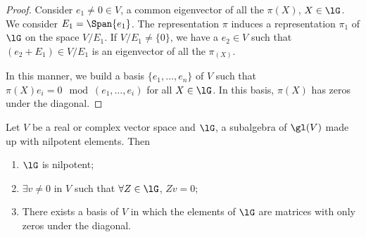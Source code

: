 \begin{proof}
	Consider $e_1\neq 0\in V$, a common eigenvector of all the $\pi(X)$, $X\in\lG$. We consider $E_1=\Span\{e_1\}$. The representation $\pi$ induces a representation $\pi_1$ of $\lG$ on the space $V/E_1$. If $V/E_1\neq\{0\}$, we have a $e_2\in V$ such that $(e_2+E_1)\in V/E_1$ is an eigenvector of all the $\pi_(X)$.

	In this manner, we build a basis $\{e_1,\ldots,e_n\}$ of $V$ such that $\pi(X)e_i=0\mod(e_1,\ldots,e_i)$ for all $X\in\lG$. In this basis, $\pi(X)$ has zeros under the diagonal.
\end{proof}

\begin{theorem}
	Let $V$ be a real or complex vector space and $\lG$, a subalgebra of $\gl(V)$ made up with nilpotent elements. Then

	\begin{enumerate}
		\item $\lG$ is nilpotent;
		\item $\exists v\neq 0$ in $V$ such that $\forall Z\in\lG$, $Zv=0$;
		\item There exists a basis of $V$ in which the elements of $\lG$ are matrices with only zeros under the diagonal.
	\end{enumerate}
	\label{tho:trois_nil}
\end{theorem}

